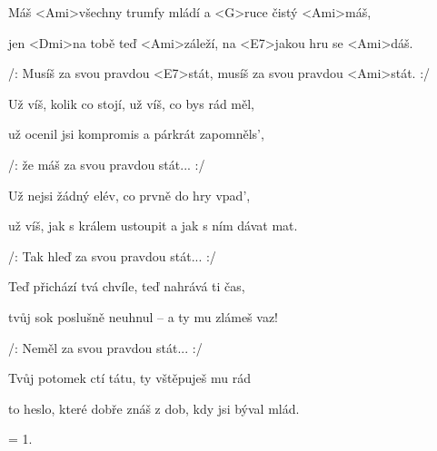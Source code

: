 

\zs
	Máš <Ami>všechny trumfy mládí a <G>ruce čistý <Ami>máš,

 jen <Dmi>na tobě teď <Ami>záleží, na <E7>jakou hru se <Ami>dáš.

 /: Musíš za svou pravdou <E7>stát, musíš za svou pravdou <Ami>stát. :/
\ks

\zs
	Už víš, kolik co stojí, už víš, co bys rád měl,

 už ocenil jsi kompromis a párkrát zapomněls',

 /: že máš za svou pravdou stát... :/
\ks

\zs
	Už nejsi žádný elév, co prvně do hry vpad',

	už víš, jak s králem ustoupit a jak s ním dávat mat.

 /: Tak hleď za svou pravdou stát... :/
\ks

\zs
	Teď přichází tvá chvíle, teď nahrává ti čas,

	tvůj sok poslušně neuhnul -- a ty mu zlámeš vaz!

 /: Neměl za svou pravdou stát... :/
\ks

\zs
	Tvůj potomek ctí tátu, ty vštěpuješ mu rád

 to heslo, které dobře znáš z dob, kdy jsi býval mlád.
\ks

\zs
	= 1.
\ks

\kp
